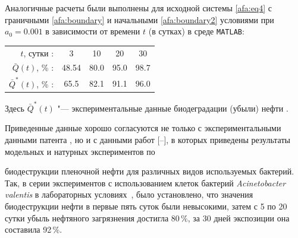 









\noindent 

Аналогичные расчеты были выполнены для исходной системы \eqref{afa:eq4} с граничными \eqref{afa:boundary} и начальными \eqref{afa:boundary2} условиями при $a_0 =0.001$ в зависимости от времени $t$ (в сутках) в среде {\tt MATLAB}:



\smallskip

{\centering



\begin{tabular}{rcccc}

$t$, сутки :& 3 & 10 & 20 & 30 \\ 

$\bar Q(t)$, \% :& 48.54 & 80.0 & 95.0 & 98.7 \\ 

$\bar Q^*(t)$, \% : & 65.5 & 82.1 & 91.1 & 96.0 \\ 

\end{tabular}



\smallskip

}



\noindent Здесь $\bar Q^*(t)$ "--- экспериментальные данные биодеградации (убыли) нефти  \cite{afa:add:3}.

Приведенные данные хорошо согласуются не только с  экспериментальными данными патента \cite{afa:add:3}, но и с данными работ [--],  в которых приведены результаты модельных и натурных экспериментов по

биодеструкции пленочной нефти для различных видов используемых бактерий. Так, в серии экспериментов с использованием клеток бактерий {\it Acinetobacter valentis} в лабораторных условиях~\cite{afa:bib11}, было установлено, что значения биодеструкции нефти в первые пять суток были невысокими, затем с 5 по 20 сутки убыль нефтяного загрязнения достигла 80\,\%, за 30 дней экспозиции она составила 92\,\%.



